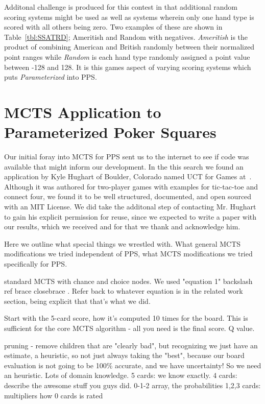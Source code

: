 \documentclass[letterpaper]{article}
\begin{document}
Additonal challenge is produced for this contest in that additional random scoring systems might be used as well as systems wherein only one hand type is scored with all others being zero. Two examples of these are shown in Table~\ref{tbl:SSATRD}; Ameritish and Random with negatives. \emph{Ameritish} is the product of combining American and British randomly between their normalized point ranges while \emph{Random} is each hand type randomly assigned a point value between -128 and 128. It is this games aspect of varying scoring systems which puts \emph{Parameterized} into PPS.


\section{MCTS Application to Parameterized Poker Squares}

Our initial foray into MCTS for PPS sent us to the internet to see if code was available that might inform our development. In the this search we found an application by Kyle Hughart of Boulder, Colorado named UCT for Games at~\cite{hughart2012uct}. Although it was authored for two-player games with examples for tic-tac-toe and connect four, we found it to be well structured, documented, and open sourced with an MIT License. We did take the additonal step of contacting Mr. Hughart to gain his explicit permission for reuse, since we expected to write a paper with our results, which we received and for that we thank and acknowledge him.

Here we outline what special things we wrestled with. What general MCTS modifications we tried independent of PPS, what MCTS modifications we tried specifically for PPS.

standard MCTS with chance and choice nodes. We used "equation 1"   backslash ref brace  closebrace   . Refer back to whatever equation is in the related work section, being explicit that that's what we did.

Start with the 5-card score, how it's computed 10 times for the board. This is sufficient for the core MCTS algorithm - all you need is the final score. Q value.

pruning - remove children that are "clearly bad", but recognizing we just have an estimate, a heuristic, so not just always taking the "best", because our board evaluation is not going to be 100\% accurate, and we have uncertainty! So we need an heuristic. Lots of domain knowledge.
5 cards: we know exactly.
4 cards: describe the awesome stuff you guys did. 0-1-2 array, the probabilities
1,2,3 cards: multipliers
how 0 cards is rated
\end{document}
